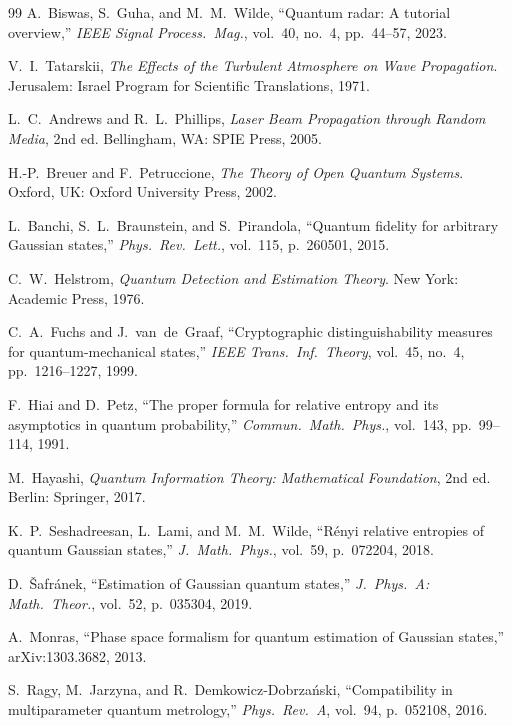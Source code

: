 \documentclass[journal]{IEEEtran}
\begin{document}
\begin{thebibliography}{99}
A.~Biswas, S.~Guha, and M.~M.~Wilde, ``Quantum radar: A tutorial overview,'' \textit{IEEE Signal Process.\ Mag.}, vol.~40, no.~4, pp.~44--57, 2023.

V.~I.~Tatarskii, \textit{The Effects of the Turbulent Atmosphere on Wave Propagation}. Jerusalem: Israel Program for Scientific Translations, 1971.

L.~C.~Andrews and R.~L.~Phillips, \textit{Laser Beam Propagation through Random Media}, 2nd ed. Bellingham, WA: SPIE Press, 2005.

H.-P.~Breuer and F.~Petruccione, \textit{The Theory of Open Quantum Systems}. Oxford, UK: Oxford University Press, 2002.

L.~Banchi, S.~L.~Braunstein, and S.~Pirandola, ``Quantum fidelity for arbitrary Gaussian states,'' \textit{Phys.\ Rev.\ Lett.}, vol.~115, p.~260501, 2015.

C.~W.~Helstrom, \textit{Quantum Detection and Estimation Theory}. New York: Academic Press, 1976.

C.~A.~Fuchs and J.~van~de~Graaf, ``Cryptographic distinguishability measures for quantum-mechanical states,'' \textit{IEEE Trans.\ Inf.\ Theory}, vol.~45, no.~4, pp.~1216--1227, 1999.

F.~Hiai and D.~Petz, ``The proper formula for relative entropy and its asymptotics in quantum probability,'' \textit{Commun.\ Math.\ Phys.}, vol.~143, pp.~99--114, 1991.

M.~Hayashi, \textit{Quantum Information Theory: Mathematical Foundation}, 2nd ed. Berlin: Springer, 2017.

K.~P.~Seshadreesan, L.~Lami, and M.~M.~Wilde, ``R\'enyi relative entropies of quantum Gaussian states,'' \textit{J.\ Math.\ Phys.}, vol.~59, p.~072204, 2018.

D.~\v{S}afr\'anek, ``Estimation of Gaussian quantum states,'' \textit{J.\ Phys.\ A: Math.\ Theor.}, vol.~52, p.~035304, 2019.

A.~Monras, ``Phase space formalism for quantum estimation of Gaussian states,'' arXiv:1303.3682, 2013.

S.~Ragy, M.~Jarzyna, and R.~Demkowicz-Dobrza\'nski, ``Compatibility in multiparameter quantum metrology,'' \textit{Phys.\ Rev.\ A}, vol.~94, p.~052108, 2016.


\end{thebibliography}
\end{document}
